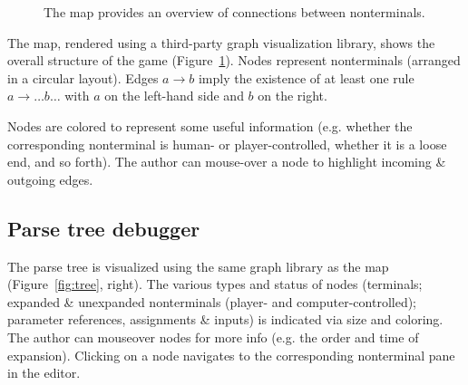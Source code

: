 \documentclass{acm_proc_article-sp}
\begin{document}
\begin{figure}
\caption{
\label{fig:map}
The map provides an overview of connections between nonterminals.
}
\end{figure}

The map, rendered using a third-party graph visualization library,
shows the overall structure of the game (Figure~\ref{fig:map}).
Nodes represent nonterminals (arranged in a circular layout).
Edges $a \to b$ imply the existence of at least one rule $a \to \ldots b \ldots$
with $a$ on the left-hand side and $b$ on the right.

Nodes are colored to represent some useful information
(e.g. whether the corresponding nonterminal is human- or player-controlled,
whether it is a loose end, and so forth).
The author can mouse-over a node to highlight incoming \& outgoing edges.

\subsection{Parse tree debugger}

The parse tree is visualized using the same graph library as the map (Figure~\ref{fig:tree}, right).
The various types and status of nodes (terminals; expanded \& unexpanded nonterminals (player- and computer-controlled); parameter references, assignments \& inputs) is indicated via size and coloring.
The author can mouseover nodes for more info (e.g. the order and time of expansion).
Clicking on a node navigates to the corresponding nonterminal pane in the editor.
\end{document}
